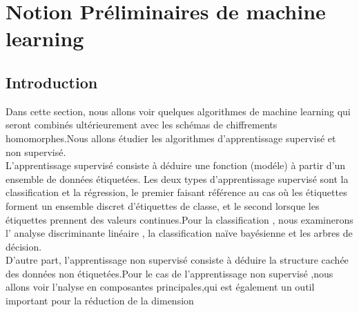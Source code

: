 \documentclass[12pt]{report}
\begin{document}
\chapter{Notion Préliminaires de machine learning}
\section{Introduction}
Dans cette section, nous allons voir quelques algorithmes de machine learning qui seront combinés  ultérieurement avec les schémas de chiffrements homomorphes.Nous allons étudier les algorithmes d'apprentissage supervisé et non supervisé.\\
L'apprentissage supervisé consiste à déduire une fonction (modéle) à partir d'un ensemble de données  étiquetées.
Les deux types d'apprentissage supervisé sont la classification et la régression, le premier faisant référence au cas où les étiquettes forment un ensemble discret d'étiquettes de classe, et le second lorsque les étiquettes prennent des valeurs continues.Pour la classification , nous examinerons l' analyse discriminante linéaire ,  la classification naïve bayésienne et les arbres de décision.\\D'autre part, l'apprentissage non supervisé consiste à déduire la structure cachée des données non étiquetées.Pour le cas de l'apprentissage non supervisé ,nous allons voir l'nalyse en composantes principales,qui est également un outil important pour la réduction de la dimension\\

\\
\\
\\
\\
\printbibliography
\end{document}
